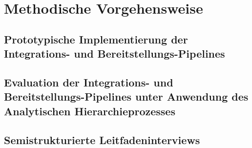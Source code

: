 \section{Methodische Vorgehensweise}

\subsection{Prototypische Implementierung der Integrations- und Bereitstellungs-Pipelines}

\subsection{Evaluation der Integrations- und Bereitstellungs-Pipelines unter Anwendung des Analytischen Hierarchieprozesses}

\subsection{Semistrukturierte Leitfadeninterviews}

